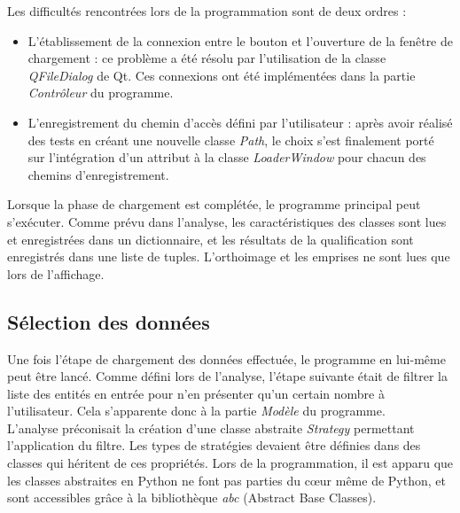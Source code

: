 \noindent Les difficultés rencontrées lors de la programmation sont de deux ordres :
\begin{itemize}[label=$\rightarrow$]
	\item L'établissement de la connexion entre le bouton et l'ouverture de la fenêtre de chargement : ce problème a été résolu par l'utilisation de la classe \textit{QFileDialog} de Qt. Ces connexions ont été implémentées dans la partie \textit{Contrôleur} du programme.
	\item L'enregistrement du chemin d'accès défini par l'utilisateur : après avoir réalisé des tests en créant une nouvelle classe \textit{Path}, le choix s'est finalement porté sur l'intégration d'un attribut à la classe \textit{LoaderWindow} pour chacun des chemins d'enregistrement.
\end{itemize}

Lorsque la phase de chargement est complétée, le programme principal peut s'exécuter. Comme prévu dans l'analyse, les caractéristiques des classes sont lues et enregistrées dans un dictionnaire, et les résultats de la qualification sont enregistrés dans une liste de tuples. L'orthoimage et les emprises ne sont lues que lors de l'affichage.

\subsection{Sélection des données}

Une fois l'étape de chargement des données effectuée, le programme en lui-même peut être lancé. Comme défini lors de l'analyse, l'étape suivante était de filtrer la liste des entités en entrée pour n'en présenter qu'un certain nombre à l'utilisateur. Cela s'apparente donc à la partie \textit{Modèle} du programme.\\

L'analyse préconisait la création d'une classe abstraite \textit{Strategy} permettant l'application du filtre. Les types de stratégies devaient être définies dans des classes qui  héritent de ces propriétés. Lors de la programmation, il est apparu que les classes abstraites en Python ne font pas parties du cœur même de Python, et sont accessibles grâce à la bibliothèque \textit{abc} (Abstract Base Classes). \\

